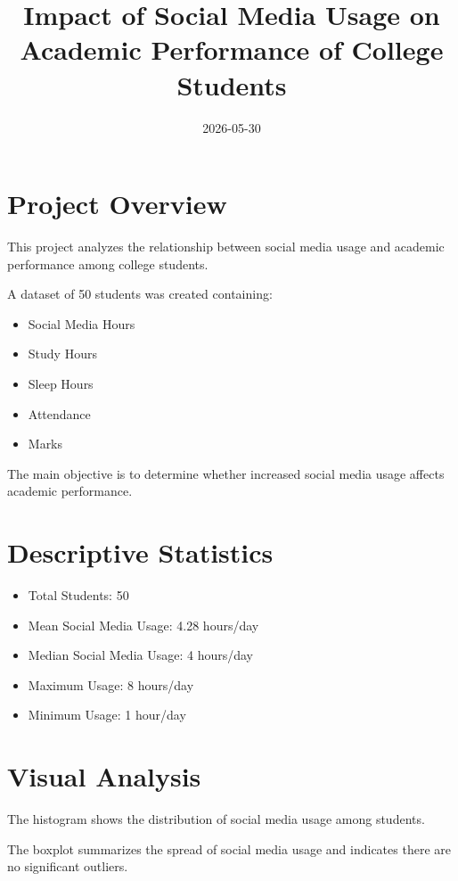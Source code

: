 \documentclass[
]{article}
\title{Impact of Social Media Usage on Academic Performance of College
Students}
\author{}
\date{\vspace{-2.5em}2026-05-30}
\providecommand{\tightlist}{%
  \setlength{\itemsep}{0pt}\setlength{\parskip}{0pt}}
\begin{document}
\maketitle

\section{Project Overview}\label{project-overview}

This project analyzes the relationship between social media usage and
academic performance among college students.

A dataset of 50 students was created containing:

\begin{itemize}
\tightlist
\item
  Social Media Hours
\item
  Study Hours
\item
  Sleep Hours
\item
  Attendance
\item
  Marks
\end{itemize}

The main objective is to determine whether increased social media usage
affects academic performance.

\section{Descriptive Statistics}\label{descriptive-statistics}

\begin{itemize}
\tightlist
\item
  Total Students: 50
\item
  Mean Social Media Usage: 4.28 hours/day
\item
  Median Social Media Usage: 4 hours/day
\item
  Maximum Usage: 8 hours/day
\item
  Minimum Usage: 1 hour/day
\end{itemize}

\section{Visual Analysis}\label{visual-analysis}

The histogram shows the distribution of social media usage among
students.

The boxplot summarizes the spread of social media usage and indicates
there are no significant outliers.
\end{document}
